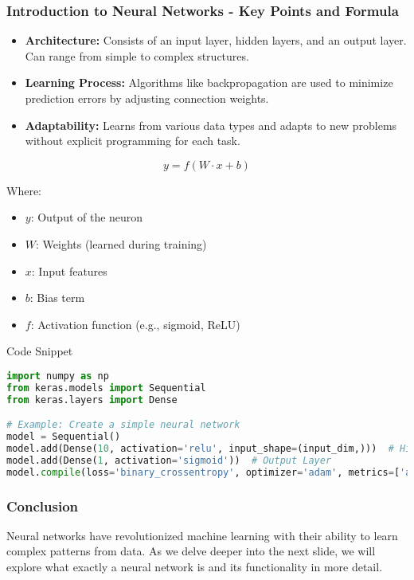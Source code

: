 \documentclass[aspectratio=169]{beamer}
\begin{document}
\begin{frame}[fragile]
    \frametitle{Introduction to Neural Networks - Key Points and Formula}
    \begin{itemize}
        \item \textbf{Architecture:} Consists of an input layer, hidden layers, and an output layer. Can range from simple to complex structures.
        \item \textbf{Learning Process:} Algorithms like backpropagation are used to minimize prediction errors by adjusting connection weights.
        \item \textbf{Adaptability:} Learns from various data types and adapts to new problems without explicit programming for each task.
    \end{itemize}
    
    \begin{equation}
        y = f(W \cdot x + b)
    \end{equation}

    Where:
    \begin{itemize}
        \item \( y \): Output of the neuron
        \item \( W \): Weights (learned during training)
        \item \( x \): Input features
        \item \( b \): Bias term
        \item \( f \): Activation function (e.g., sigmoid, ReLU)
    \end{itemize}
    
    \begin{block}{Code Snippet}
        \begin{lstlisting}[language=Python]
import numpy as np
from keras.models import Sequential
from keras.layers import Dense

# Example: Create a simple neural network
model = Sequential()
model.add(Dense(10, activation='relu', input_shape=(input_dim,)))  # Hidden Layer
model.add(Dense(1, activation='sigmoid'))  # Output Layer
model.compile(loss='binary_crossentropy', optimizer='adam', metrics=['accuracy'])
        \end{lstlisting}
    \end{block}
\end{frame}

\begin{frame}[fragile]
    \frametitle{Conclusion}
    Neural networks have revolutionized machine learning with their ability to learn complex patterns from data. 
    As we delve deeper into the next slide, we will explore what exactly a neural network is and its functionality in more detail.
\end{frame}
\end{document}
